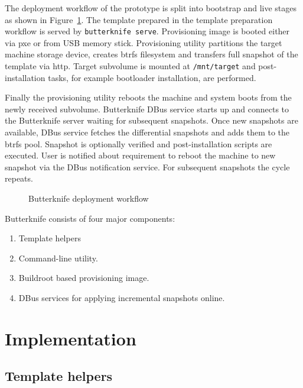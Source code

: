 \documentclass[a4paper,11pt]{kth-mag}
\begin{document}
The deployment workflow of the prototype is split into
bootstrap and live stages as shown in
Figure~\ref{fig:butterknife-workflow}.
The template prepared in the template preparation workflow
is served by \lstinline!butterknife serve!.
Provisioning image is booted either via
\acrfull{pxe} or from USB memory stick.
Provisioning utility
partitions the target machine storage device,
creates \acrshort{btrfs} filesystem and
transfers full snapshot of the template via \acrfull{http}.
Target subvolume is mounted at \lstinline!/mnt/target!
and post-installation tasks, for example
bootloader installation, are performed.

Finally the provisioning utility reboots the machine
and system boots from the newly received subvolume.
Butterknife DBus service starts up and
connects to the Butterknife server waiting for
subsequent snapshots.
Once new snapshots are available,
DBus service fetches the differential snapshots and
adds them to the \acrshort{btrfs} pool.
Snapshot is optionally verified and post-installation
scripts are executed.
User is notified about requirement to reboot the
machine to new snapshot via the DBus notification service.
For subsequent snapshots the cycle repeats.


\begin{figure}[!htb]
\centering
\scalebox{0.6}{}
\caption{Butterknife deployment workflow}
\label{fig:butterknife-workflow}
\end{figure}



\noindent Butterknife consists of four major components:

\begin{enumerate}
\item Template helpers
\item Command-line utility.
\item Buildroot based provisioning image.
\item DBus services for applying incremental snapshots online.
\end{enumerate}


%
%
%
%
\chapter{Implementation}
\label{chap:impl}



\section{Template helpers}
\end{document}
